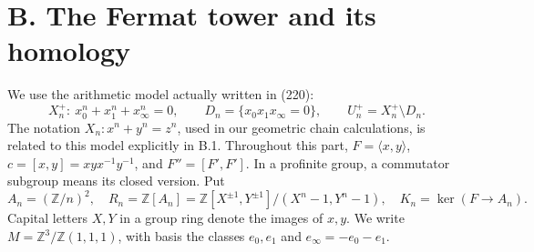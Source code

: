 \section{B. The Fermat tower and its homology}

We use the arithmetic model actually written in (220):
\[
 X_n^+:\ x_0^n+x_1^n+x_\infty^n=0,\qquad
 D_n=\{x_0x_1x_\infty=0\},\qquad U_n^+=X_n^+\setminus D_n.
\]
The notation \(X_n:x^n+y^n=z^n\), used in our geometric chain
calculations, is related to this model explicitly in B.1. Throughout this
part, \(F=\langle x,y\rangle\), \(c=[x,y]=xyx^{-1}y^{-1}\), and
\(F''=[F',F']\). In a profinite group, a commutator subgroup means its
closed version. Put
\[
 A_n=(\mathbb Z/n)^2,\quad
 R_n=\mathbb Z[A_n]=
 \mathbb Z[X^{\pm1},Y^{\pm1}]/(X^n-1,Y^n-1),
 \quad K_n=\ker(F\longrightarrow A_n).
\]
Capital letters \(X,Y\) in a group ring denote the images of \(x,y\).
We write
\(M=\mathbb Z^3/\mathbb Z(1,1,1)\), with basis the classes \(e_0,e_1\)
and \(e_\infty=-e_0-e_1\).

